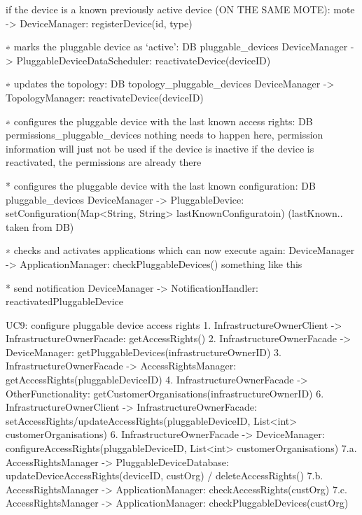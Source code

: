             if the device is a known previously active device (ON THE SAME MOTE):
                mote -> DeviceManager: registerDevice(id, type)

                ∗ marks the pluggable device as ‘active’: DB pluggable_devices
                    DeviceManager -> PluggableDeviceDataScheduler: reactivateDevice(deviceID)

                ∗ updates the topology: DB topology_pluggable_devices
                    DeviceManager -> TopologyManager: reactivateDevice(deviceID)

                ∗ configures the pluggable device with the last known access rights: DB permissions_pluggable_devices
                    nothing needs to happen here, permission information will just not be used if the device is inactive
                                                  if the device is reactivated, the permissions are already there

                * configures the pluggable device with the last known configuration: DB pluggable_devices
                    DeviceManager -> PluggableDevice: setConfiguration(Map<String, String> lastKnownConfiguratoin) (lastKnown.. taken from DB)

                ∗ checks and activates applications which can now execute again:
                    DeviceManager -> ApplicationManager: checkPluggableDevices() something like this

                * send notification
                    DeviceManager -> NotificationHandler: reactivatedPluggableDevice

        UC9: configure pluggable device access rights
            1. InfrastructureOwnerClient -> InfrastructureOwnerFacade: getAccessRights()
                2. InfrastructureOwnerFacade -> DeviceManager: getPluggableDevices(infrastructureOwnerID)
                3. InfrastructureOwnerFacade -> AccessRightsManager: getAccessRights(pluggableDeviceID)
                4. InfrastructureOwnerFacade -> OtherFunctionality: getCustomerOrganisations(infrastructureOwnerID)
            6. InfrastructureOwnerClient -> InfrastructureOwnerFacade: setAccessRights/updateAccessRights(pluggableDeviceID, List<int> customerOrganisations)
                6. InfrastructureOwnerFacade -> DeviceManager: configureAccessRights(pluggableDeviceID, List<int> customerOrganisations)
                7.a. AccessRightsManager -> PluggableDeviceDatabase: updateDeviceAccessRights(deviceID, custOrg) / deleteAccessRights()
                7.b. AccessRightsManager -> ApplicationManager: checkAccessRights(custOrg)
                7.c. AccessRightsManager -> ApplicationManager: checkPluggableDevices(custOrg)


